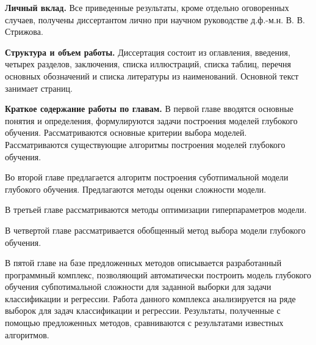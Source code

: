 \vspace{0.5cm}
\textbf{Личный вклад.} Все приведенные результаты, кроме отдельно оговоренных случаев, получены диссертантом лично при научном руководстве д.ф.-м.н. В. В. Стрижова.


\vspace{0.5cm}
\textbf{Структура и объем работы.} Диссертация состоит из оглавления, введения, четырех разделов, заключения, списка иллюстраций, списка таблиц, перечня основных обозначений и списка литературы из  наименований. Основной текст занимает \pageref{LastPage} страниц.

\vspace{0.5cm}
\textbf{Краткое содержание работы по главам.} В первой главе вводятся основные понятия и определения, формулируются задачи построения моделей глубокого обучения. Рассматриваются основные критерии выбора моделей. Рассматриваются существующие алгоритмы построения моделей глубокого обучения.

Во второй главе предлагается алгоритм построения суботпимальной модели глубокого обучения. Предлагаются методы оценки сложности модели.

В третьей главе рассматриваются методы оптимизации гиперпараметров модели.

В четвертой главе рассматривается обобщенный метод выбора модели глубокого обучения. 

В пятой главе на базе предложенных методов описывается разработанный программный комплекс, позволяющий автоматически построить модель глубокого обучения субпотимальной сложности для заданной выборки для задачи классификации и регрессии. Работа данного комплекса анализируется на ряде выборок для задач классификации и регрессии. Результаты, полученные с помощью предложенных методов, сравниваются с результатами известных алгоритмов.

